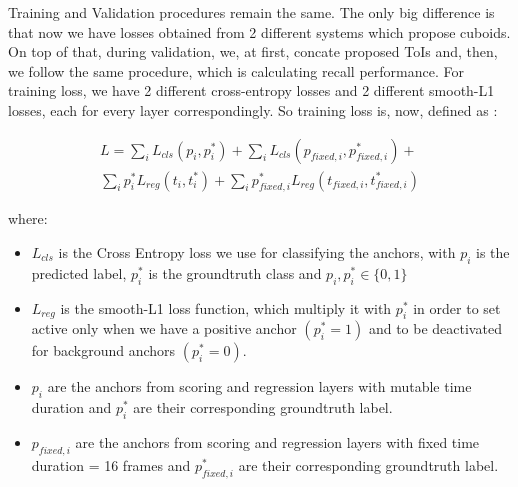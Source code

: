 \par
Training and Validation procedures remain the same. The only big difference is that now we have losses obtained from 2 different systems which propose cuboids. On top of that,
during validation, we, at first, concate proposed ToIs and, then, we follow the same procedure, which is calculating recall performance. For training loss, we have 2 different cross-entropy losses and 2 different smooth-L1 losses, each for every
layer correspondingly. So training loss is, now, defined as :





\begin{equation} 
\begin{split}
 L  =  \sum_iL_{cls}(p_i, p_i^*) + \sum_iL_{cls}(p_{fixed,i}, p_{fixed,i}^*) + \\
   \sum_ip_i^*L_{reg}(t_i,t_i^*) + \sum_ip_{fixed,i}^*L_{reg}(t_{fixed,i},t_{fixed,i}^*) 
\end{split}
\end{equation}

where:
\begin{itemize}
  \item $L_{cls} $ is the Cross Entropy loss we use for classifying the anchors, with $p_i$ is the predicted label, $p_i^*$ is the groundtruth class and
  $p_i, p_i^* \in \{0,1\}$
\item $L_{reg} $ is the smooth-L1 loss function, which multiply it with $p_i^*$ in order to set active only when we have a positive anchor $(p_i^* = 1)$
  and to be deactivated for background anchors $(p_i^* = 0)$.
\item $p_i $ are the anchors from scoring and regression layers with mutable time duration and $p_i^*$ are their corresponding groundtruth label.
\item $p_{fixed,i} $ are the anchors from scoring and regression layers with fixed time duration = 16 frames and $p_{fixed,i}^*$ are their corresponding groundtruth label.
\end{itemize}

